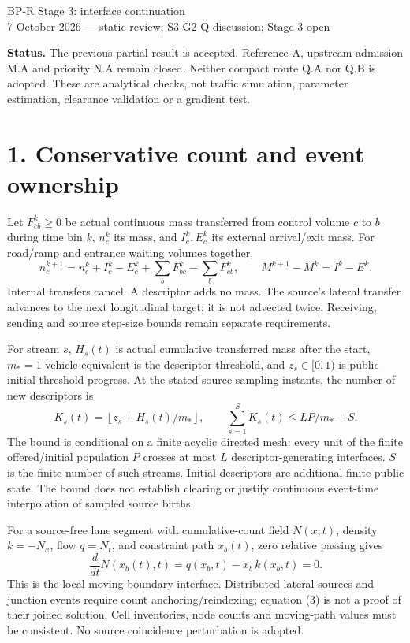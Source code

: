 \documentclass[11pt,a4paper]{article}
\begin{document}
{\Large BP-R Stage 3: interface continuation}\\[4pt]
7 October 2026 --- static review; S3-G2-Q discussion; Stage 3 open

\textbf{Status.} The previous partial result is accepted. Reference A,
upstream admission M.A and priority N.A remain closed. Neither compact route
Q.A nor Q.B is adopted. These are analytical checks, not traffic simulation,
parameter estimation, clearance validation or a gradient test.

\section*{1. Conservative count and event ownership}
Let $F_{cb}^k\ge0$ be actual continuous mass transferred from control volume
$c$ to $b$ during time bin $k$, $n_c^k$ its mass, and $I_c^k,E_c^k$ its external
arrival/exit mass. For road/ramp and entrance waiting volumes together,
\begin{equation}
n_c^{k+1}=n_c^k+I_c^k-E_c^k+
 \sum_b F_{bc}^k-\sum_b F_{cb}^k,
\qquad M^{k+1}-M^k=I^k-E^k.
\end{equation}
Internal transfers cancel. A descriptor adds no mass. The source's lateral
transfer advances to the next longitudinal target; it is not advected twice.
Receiving, sending and source step-size bounds remain separate requirements.

For stream $s$, $H_s(t)$ is actual cumulative transferred mass after the start,
$m_*=1$ vehicle-equivalent is the descriptor threshold, and
$z_s\in[0,1)$ is public initial threshold progress. At the stated source
sampling instants, the number of new descriptors is
\begin{equation}
K_s(t)=\left\lfloor z_s+H_s(t)/m_*\right\rfloor,
\qquad \sum_{s=1}^{S}K_s(t)\le LP/m_*+S.
\end{equation}
The bound is conditional on a finite acyclic directed mesh: every unit of the
finite offered/initial population $P$ crosses at most $L$ descriptor-generating
interfaces. $S$ is the finite number of such streams. Initial descriptors are
additional finite public state. The bound does not establish clearing or
justify continuous event-time interpolation of sampled source births.

For a source-free lane segment with cumulative-count field $N(x,t)$, density
$k=-N_x$, flow $q=N_t$, and constraint path $x_b(t)$, zero relative passing gives
\begin{equation}
\frac{d}{dt}N(x_b(t),t)=q(x_b,t)-\dot x_b\,k(x_b,t)=0.
\end{equation}
This is the local moving-boundary interface. Distributed lateral sources and
junction events require count anchoring/reindexing; equation (3) is not a
proof of their joined solution. Cell inventories, node counts and moving-path
values must be consistent. No source coincidence perturbation is adopted.
\end{document}

